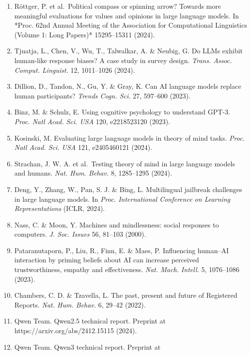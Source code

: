 \documentclass[
  11pt,
]{article}
\begin{document}
\begin{enumerate}
  models' sensitivity to spurious features in prompt design or: how I
  learned to start worrying about prompt formatting. In \emph{Proc.
  International Conference on Learning Representations} (ICLR, 2024).
\item
  Röttger, P. et al.~Political compass or spinning arrow? Towards more
  meaningful evaluations for values and opinions in large language
  models. In *Proc. 62nd Annual Meeting of the Association for
  Computational Linguistics (Volume 1: Long Papers)* 15295--15311
  (2024).
\item
  Tjuatja, L., Chen, V., Wu, T., Talwalkar, A. \& Neubig, G. Do LLMs
  exhibit human-like response biases? A case study in survey design.
  \emph{Trans. Assoc. Comput. Linguist.} 12, 1011--1026 (2024).
\item
  Dillion, D., Tandon, N., Gu, Y. \& Gray, K. Can AI language models
  replace human participants? \emph{Trends Cogn. Sci.} 27, 597--600
  (2023).
\item
  Binz, M. \& Schulz, E. Using cognitive psychology to understand GPT-3.
  \emph{Proc. Natl Acad. Sci. USA} 120, e2218523120 (2023).
\item
  Kosinski, M. Evaluating large language models in theory of mind tasks.
  \emph{Proc. Natl Acad. Sci. USA} 121, e2405460121 (2024).
\item
  Strachan, J. W. A. et al.~Testing theory of mind in large language
  models and humans. \emph{Nat. Hum. Behav.} 8, 1285--1295 (2024).
\item
  Deng, Y., Zhang, W., Pan, S. J. \& Bing, L. Multilingual jailbreak
  challenges in large language models. In \emph{Proc. International
  Conference on Learning Representations} (ICLR, 2024).
\item
  Nass, C. \& Moon, Y. Machines and mindlessness: social responses to
  computers. \emph{J. Soc. Issues} 56, 81--103 (2000).
\item
  Pataranutaporn, P., Liu, R., Finn, E. \& Maes, P. Influencing
  human--AI interaction by priming beliefs about AI can increase
  perceived trustworthiness, empathy and effectiveness. \emph{Nat. Mach.
  Intell.} 5, 1076--1086 (2023).
\item
  Chambers, C. D. \& Tzavella, L. The past, present and future of
  Registered Reports. \emph{Nat. Hum. Behav.} 6, 29--42 (2022).
\item
  Qwen Team. Qwen2.5 technical report. Preprint at
  https://arxiv.org/abs/2412.15115 (2024).
\item
  Qwen Team. Qwen3 technical report. Preprint at

\end{enumerate}
\end{document}
